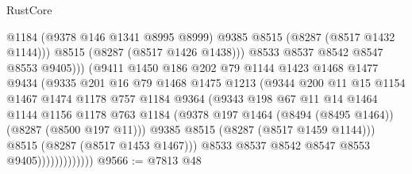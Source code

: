 \begin{lexlean}{RustCore}
\begin{coremodule}
                                    @1184
                                    (@9378 @146 @1341 @8995 @8999)
                                    @9385
                                    @8515
                                    (@8287 (@8517 @1432 @1144)))
                                  @8515
                                  (@8287 (@8517 @1426 @1438)))
                                @8533
                                @8537
                                @8542
                                @8547
                                @8553
                                @9405)))
                          (@9411
                            @1450
                            @186
                            @202
                            @79
                            @1144
                            @1423
                            @1468
                            @1477
                            @9434
                            (@9335
                              @201
                              @16
                              @79
                              @1468
                              @1475
                              @1213
                              (@9344
                                @200
                                @11
                                @15
                                @1154
                                @1467
                                @1474
                                @1178
                                @757
                                @1184
                                @9364
                                (@9343
                                  @198
                                  @67
                                  @11
                                  @14
                                  @1464
                                  @1144
                                  @1156
                                  @1178
                                  @763
                                  @1184
                                  (@9378 @197 @1464 (@8494 (@8495 @1464)) (@8287 (@8500 @197 @11)))
                                  @9385
                                  @8515
                                  (@8287 (@8517 @1459 @1144)))
                                @8515
                                (@8287 (@8517 @1453 @1467)))
                              @8533
                              @8537
                              @8542
                              @8547
                              @8553
                              @9405)))))))))))))
@9566 := @7813 @48

\end{coremodule}
\end{lexlean}
